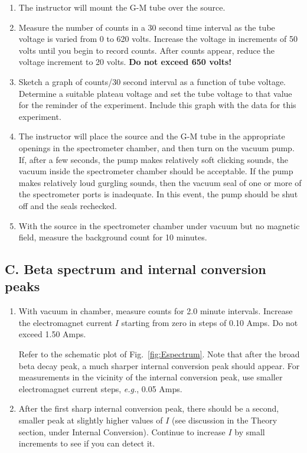 \begin{enumerate}
\item The instructor will mount the G-M tube over the \cs source.

\item Measure the number of counts in a 30 second time interval as the
tube voltage is varied from 0 to 620 volts.  Increase the voltage in
increments of 50 volts until you begin to record counts.  After counts
appear, reduce the voltage increment to 20 volts. {\bf Do not exceed 650
volts!}

\item Sketch a graph of counts/30 second interval as a function of tube
voltage.  Determine a suitable plateau voltage and set the tube
voltage to that value for the reminder of the experiment. 
Include this graph with the data for this experiment.

\item The instructor will place the \cs source and the G-M tube in
the appropriate openings in the spectrometer chamber, and then turn on
the vacuum pump.  If, after a few seconds, the pump makes relatively
soft clicking sounds, the vacuum inside the spectrometer chamber should
be acceptable.  If the pump makes relatively loud gurgling sounds,
then the vacuum seal of one or more of the spectrometer ports is
inadequate.  In this event, the pump should be shut off and the seals
rechecked.

\item With the source in the spectrometer chamber under vacuum but no
magnetic field, measure the background count for 10 minutes.

\end{enumerate}

\subsection{C.  Beta spectrum and internal conversion peaks}

\begin{enumerate}

\item With vacuum in chamber, measure counts for 2.0 minute intervals.
Increase the electromagnet current $I$ starting from zero in steps of
0.10 Amps.  Do not exceed 1.50 Amps.

Refer to the schematic plot of Fig.~\ref{fig:Espectrum}.  Note that after the broad beta
decay peak, a much sharper internal conversion peak should appear.
For measurements in the vicinity of the internal conversion peak, use
smaller electromagnet current steps, {\em e.g.}, 0.05 Amps.

\item After the first sharp internal conversion peak, there should be a
second, smaller peak at slightly higher values of $I$ (see discussion in
the Theory section, under Internal Conversion).  Continue to increase
$I$ by small increments to see if you can detect it.

\end{enumerate}

